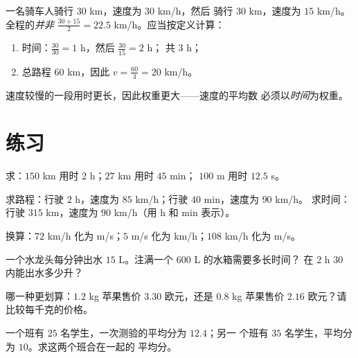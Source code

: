 \begin{example}[两段行程的平均速度]\label{ex:g8:speed:twolegs}
一名骑车人骑行 $30$ km，速度为 $30$ km/h，然后
骑行 $30$ km，速度为 $15$ km/h。全程的\emph{并非}
$\frac{30 + 15}{2} = 22.5$ km/h。应当按定义计算：
\begin{enumerate}
  \item 时间：$\frac{30}{30} = 1$ h，然后 $\frac{30}{15} = 2$ h；
        共 $3$ h；
  \item 总路程 $60$ km，因此
        $v = \frac{60}{3} = 20$ km/h。
\end{enumerate}
速度较慢的一段用时更长，因此权重更大——速度的平均数
必须以\emph{时间}为权重。
\end{example}

\section{练习}

\begin{exercise}[$\star$]\label{exo:g8:speed:1}
求：$150$ km 用时 $2$ h；$27$ km 用时 $45$ min；
$100$ m 用时 $12.5$ s。
\end{exercise}

\begin{exercise}[$\star$]\label{exo:g8:speed:2}
求路程：行驶 $2$ h，速度为 $85$ km/h；行驶 $40$ min，速度为 $90$ km/h。
求时间：行驶 $315$ km，速度为 $90$ km/h（用 h 和 min 表示）。
\end{exercise}

\begin{exercise}[$\star$]\label{exo:g8:speed:3}
换算：$72$ km/h 化为 m/s；$5$ m/s 化为 km/h；$108$ km/h 化为 m/s。
\end{exercise}

\begin{exercise}[$\star$]\label{exo:g8:speed:4}
一个水龙头每分钟出水 $15$ L。注满一个 $600$ L 的水箱需要多长时间？
在 $2$ h $30$ 内能出水多少升？
\end{exercise}

\begin{exercise}[$\star$]\label{exo:g8:speed:5}
哪一种更划算：$1.2$ kg 苹果售价 $3.30$ 欧元，还是
$0.8$ kg 苹果售价 $2.16$ 欧元？请比较每千克的价格。
\end{exercise}

\begin{exercise}[$\star$]\label{exo:g8:speed:6}
一个班有 $25$ 名学生，一次测验的平均分为 $12.4$；另一
个班有 $35$ 名学生，平均分为 $10$。求这两个班合在一起的
平均分。
\end{exercise}

